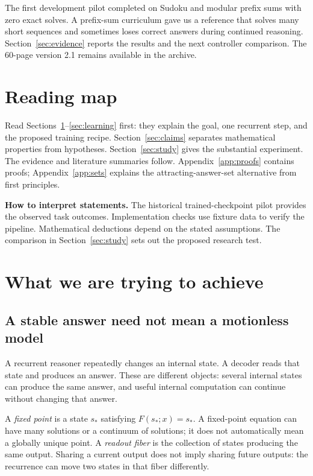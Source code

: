 \documentclass[11pt,a4paper]{article}
\newcommand{\status}[1]{\par\noindent{\sffamily\small\bfseries\color{teal}#1}\par}
\newcommand{\newtopic}{\clearpage}
\begin{document}
\vfill
\status{EVIDENCE STATUS}
The first development pilot completed on Sudoku and modular prefix sums with zero exact solves. A prefix-sum curriculum gave us a reference that solves many short sequences and sometimes loses correct answers during continued reasoning. Section~\ref{sec:evidence} reports the results and the next controller comparison. The 60-page version 2.1 remains available in the archive.

\newtopic
\section*{Reading map}
Read Sections~\ref{sec:question}--\ref{sec:learning} first: they explain the goal, one recurrent step, and the proposed training recipe. Section~\ref{sec:claims} separates mathematical properties from hypotheses. Section~\ref{sec:study} gives the substantial experiment. The evidence and literature summaries follow. Appendix~\ref{app:proofs} contains proofs; Appendix~\ref{app:sets} explains the attracting-answer-set alternative from first principles.

\textbf{How to interpret statements.} The historical trained-checkpoint pilot provides the observed task outcomes. Implementation checks use fixture data to verify the pipeline. Mathematical deductions depend on the stated assumptions. The comparison in Section~\ref{sec:study} sets out the proposed research test.

\begingroup\small\setlength{\parskip}{0pt}
\makeatletter\renewcommand{\l@section}[2]{\@dottedtocline{1}{0em}{2em}{#1}{#2}}\makeatother
\tableofcontents\endgroup

\newtopic
\section{What we are trying to achieve}\label{sec:question}
\subsection{A stable answer need not mean a motionless model}
A recurrent reasoner repeatedly changes an internal state. A decoder reads that state and produces an answer. These are different objects: several internal states can produce the same answer, and useful internal computation can continue without changing that answer.

A \emph{fixed point} is a state $s_*$ satisfying $F(s_*;x)=s_*$. A fixed-point equation can have many solutions or a continuum of solutions; it does not automatically mean a globally unique point. A \emph{readout fiber} is the collection of states producing the same output. Sharing a current output does not imply sharing future outputs: the recurrence can move two states in that fiber differently.
\end{document}

